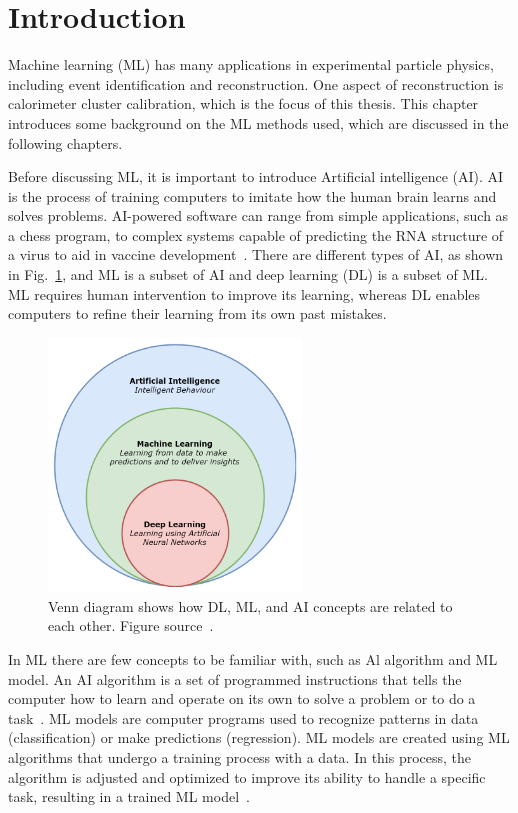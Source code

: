 
\section{Introduction}
Machine learning (ML) has many applications in experimental particle physics, including event identification and reconstruction.
One aspect of reconstruction is calorimeter cluster calibration, which is the focus of this thesis.
This chapter introduces some background on the ML methods used, which are discussed in the following chapters.

Before discussing ML, it is important to introduce Artificial intelligence (AI).
AI is the process of training computers to imitate how the human brain learns and solves problems.
AI-powered software can range from simple applications, such as a chess program, to complex systems capable of predicting the RNA structure of a virus to aid in vaccine development~\cite{DL_ML_guide}.
There are different types of AI, as shown in Fig.~\ref{fig:ML_diagram}, and ML is a subset of AI and deep learning (DL) is a subset of ML.
ML requires human intervention to improve its learning, whereas DL enables computers to refine their learning from its own past mistakes.

\begin{figure}[t!]
\centering
\includegraphics[width=0.60\textwidth]{figures/ML_subsections.png}
\caption[Diagram of AI subsections]{Venn diagram shows how DL, ML, and AI concepts are related to each other. Figure source~\cite{ML_diagram}.}
\label{fig:ML_diagram}
\end{figure}

In ML there are few concepts to be familiar with, such as Al algorithm and ML model.
An AI algorithm is a set of programmed instructions that tells the computer how to learn and operate on its own to solve a problem or to do a task~\cite{AI_overview}.
ML models are computer programs used to recognize patterns in data (classification) or make predictions (regression).
ML models are created using ML algorithms that undergo a training process with a data.
In this process, the algorithm is adjusted and optimized to improve its ability to handle a specific task, resulting in a trained ML model~\cite{ML_models}.

